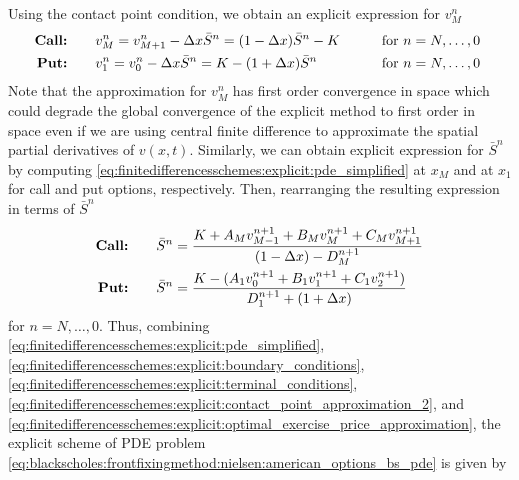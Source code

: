Using the contact point condition, we obtain an explicit expression for $v^{n}_{M}$
\begin{subequations}
  \label{eq:finitedifferencesschemes:explicit:contact_point_approximation_2}
  \begin{align}
    \text{\textbf{Call:}} \qquad& v^{n}_{M} = v^{n}_{M+1} - \Delta{x}\bar{S}^{n} = (1-\Delta{x})\bar{S}^n - K & \qquad \text{for $n = N,\dots,0$ }\\
    \text{\textbf{Put:}} \qquad& v^{n}_{1} = v^{n}_{0} - \Delta{x}\bar{S}^{n} = K - (1+\Delta{x})\bar{S}^n & \qquad \text{for $n = N,\dots,0$ }
  \end{align}    
\end{subequations}
Note that the approximation for $v^{n}_{M}$ has first order convergence in space which could degrade the global convergence of the explicit method to first order in space even if we are using central finite difference to approximate the spatial partial derivatives of $v(x,t)$. Similarly, we can obtain explicit expression for $\bar{S}^{n}$ by computing \eqref{eq:finitedifferencesschemes:explicit:pde_simplified} at $x_M$ and at $x_1$ for call and put options, respectively. Then, rearranging the resulting expression in terms of $\bar{S}^n$ 
\begin{subequations}
  \label{eq:finitedifferencesschemes:explicit:optimal_exercise_price_approximation}
  \begin{align}
    \text{\textbf{Call:}} \qquad& \bar{S}^{n} = \dfrac{K + A_{M}v^{n+1}_{M-1} + B_{M}v^{n+1}_{M} + C_{M}v^{n+1}_{M+1}}{(1-\Delta{x}) - D^{n+1}_{M}} \\
    \text{\textbf{Put:}} \qquad& \bar{S}^{n} = \dfrac{K - (A_{1}v^{n+1}_{0} + B_{1}v^{n+1}_{1} + C_{1}v^{n+1}_{2})}{D^{n+1}_1 + (1+\Delta{x})}
  \end{align}
\end{subequations}
for $n = N,\dots,0$. Thus, combining \eqref{eq:finitedifferencesschemes:explicit:pde_simplified}, \eqref{eq:finitedifferencesschemes:explicit:boundary_conditions}, 
\eqref{eq:finitedifferencesschemes:explicit:terminal_conditions},
\eqref{eq:finitedifferencesschemes:explicit:contact_point_approximation_2}, and \eqref{eq:finitedifferencesschemes:explicit:optimal_exercise_price_approximation}, the explicit scheme of PDE problem \eqref{eq:blackscholes:frontfixingmethod:nielsen:american_options_bs_pde} is given by
